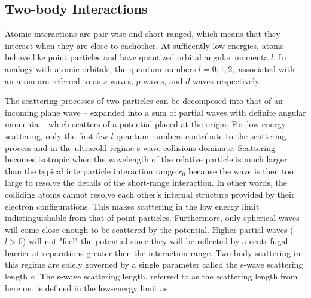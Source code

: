\subsection{Two-body Interactions}
Atomic interactions are pair-wise and short ranged, which means that they interact when they are close to eachother. At sufficently low energies, atoms behave like point particles and have quantized orbital angular momenta $l$. In analogy with atomic orbitals, the quantum numbers $l=0,1,2,$ associated with an atom are referred to as $s$-waves, $p$-waves, and $d$-waves respectively. 

The scattering processes of two particles can be decomposed into that of an incoming plane wave -- expanded into a sum of partial waves with definite angular momenta -- which scatters of a potential placed at the origin. For low energy scattering, only the first few $l$-quantum numbers contribute to the scattering process and in the ultracold regime s-wave collisions dominate. Scattering becomes isotropic when the wavelength of the relative particle is much larger than the typical interparticle interaction range $r_0$ because the wave is then too large to resolve the details of the short-range interaction. In other words, the colliding atoms cannot resolve each other's internal structure provided by their electron configurations. This makes scattering in the low energy limit indistinguishable from that of point particles. Furthermore, only spherical waves will come close enough to be scattered by the potential. Higher partial waves ($l>0$) will not "feel" the potential since they will be reflected by a centrifugal barrier at separations greater then the interaction range. Two-body scattering in this regime are solely governed by a single parameter called the s-wave scattering length $a$. The s-wave scattering length, referred to as the scattering length from here on, is defined in the low-energy limit as

